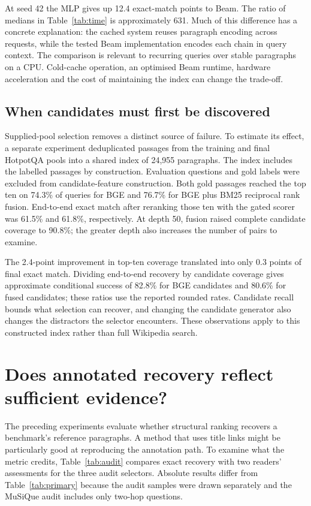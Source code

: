\documentclass[twoside,a4paper,11pt]{article}
\begin{document}
At seed 42 the MLP gives up 12.4 exact-match points to Beam. The ratio of medians in Table~\ref{tab:time} is approximately 631. Much of this difference has a concrete explanation: the cached system reuses paragraph encoding across requests, while the tested Beam implementation encodes each chain in query context. The comparison is relevant to recurring queries over stable paragraphs on a CPU. Cold-cache operation, an optimised Beam runtime, hardware acceleration and the cost of maintaining the index can change the trade-off.

\subsection{When candidates must first be discovered}
Supplied-pool selection removes a distinct source of failure. To estimate its effect, a separate experiment deduplicated passages from the training and final HotpotQA pools into a shared index of 24,955 paragraphs. The index includes the labelled passages by construction. Evaluation questions and gold labels were excluded from candidate-feature construction. Both gold passages reached the top ten on 74.3\% of queries for BGE and 76.7\% for BGE plus BM25 reciprocal rank fusion. End-to-end exact match after reranking those ten with the gated scorer was 61.5\% and 61.8\%, respectively. At depth 50, fusion raised complete candidate coverage to 90.8\%; the greater depth also increases the number of pairs to examine.

The 2.4-point improvement in top-ten coverage translated into only 0.3 points of final exact match. Dividing end-to-end recovery by candidate coverage gives approximate conditional success of 82.8\% for BGE candidates and 80.6\% for fused candidates; these ratios use the reported rounded rates. Candidate recall bounds what selection can recover, and changing the candidate generator also changes the distractors the selector encounters. These observations apply to this constructed index rather than full Wikipedia search.

\section{Does annotated recovery reflect sufficient evidence?}
The preceding experiments evaluate whether structural ranking recovers a benchmark's reference paragraphs. A method that uses title links might be particularly good at reproducing the annotation path. To examine what the metric credits, Table~\ref{tab:audit} compares exact recovery with two readers' assessments for the three audit selectors. Absolute results differ from Table~\ref{tab:primary} because the audit samples were drawn separately and the MuSiQue audit includes only two-hop questions.
\end{document}
